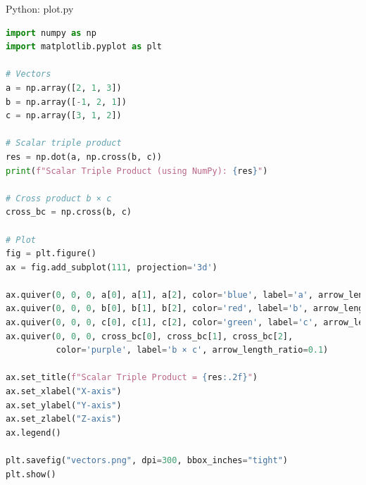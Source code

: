 \documentclass{beamer}
\numberwithin{equation}{section}
\theoremstyle{remark}
\begin{document}
\begin{frame}[fragile]{Python: plot.py}
\begin{lstlisting}[language=Python]
import numpy as np
import matplotlib.pyplot as plt

# Vectors
a = np.array([2, 1, 3])
b = np.array([-1, 2, 1])
c = np.array([3, 1, 2])

# Scalar triple product
res = np.dot(a, np.cross(b, c))
print(f"Scalar Triple Product (using NumPy): {res}")

# Cross product b × c
cross_bc = np.cross(b, c)

# Plot
fig = plt.figure()
ax = fig.add_subplot(111, projection='3d')

ax.quiver(0, 0, 0, a[0], a[1], a[2], color='blue', label='a', arrow_length_ratio=0.1)
ax.quiver(0, 0, 0, b[0], b[1], b[2], color='red', label='b', arrow_length_ratio=0.1)
ax.quiver(0, 0, 0, c[0], c[1], c[2], color='green', label='c', arrow_length_ratio=0.1)
ax.quiver(0, 0, 0, cross_bc[0], cross_bc[1], cross_bc[2],
          color='purple', label='b × c', arrow_length_ratio=0.1)

ax.set_title(f"Scalar Triple Product = {res:.2f}")
ax.set_xlabel("X-axis")
ax.set_ylabel("Y-axis")
ax.set_zlabel("Z-axis")
ax.legend()

plt.savefig("vectors.png", dpi=300, bbox_inches="tight")
plt.show()

\end{lstlisting}
\end{frame}
\end{document}
